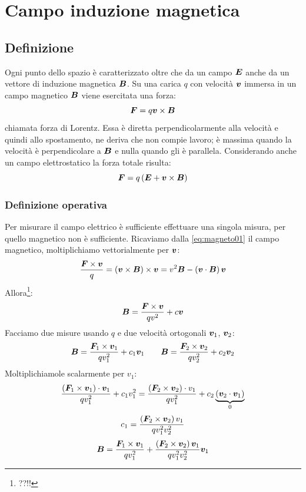 \chapter{Campo induzione magnetica}
\minitoc
\section{Definizione}
Ogni punto dello spazio è caratterizzato oltre che da un campo $\boldsymbol{E}$ anche da un vettore di induzione magnetica $\boldsymbol{B}$. Su una carica $q$ con velocità $\boldsymbol{v}$ immersa in un campo magnetico $\boldsymbol{B}$ viene esercitata una forza:
\begin{equation}
  \boldsymbol{F}=q\boldsymbol{v}\times\boldsymbol{B}
  \label{eq:magneto01}
\end{equation}
chiamata forza di Lorentz. Essa è diretta perpendicolarmente alla velocità e quindi allo spostamento, ne deriva che non compie lavoro; è massima quando la velocità è perpendicolare a $\boldsymbol{B}$ e nulla quando gli è parallela. Considerando anche un campo elettrostatico la forza totale risulta:
\begin{equation}
  \boldsymbol{F}=q\left(\boldsymbol{E}+\boldsymbol{v}\times \boldsymbol{B}\right)
  \label{eq:forza_lorentz2}
\end{equation}
\subsection{Definizione operativa}
Per misurare il campo elettrico è sufficiente effettuare una singola misura, per quello magnetico non è sufficiente. Ricaviamo dalla \eqref{eq:magneto01} il campo magnetico, moltiplichiamo vettorialmente per $\boldsymbol{v}$:
\[\frac{\boldsymbol{F}\times\boldsymbol{v}}{q}=\left(\boldsymbol{v}\times\boldsymbol{B}\right)\times\boldsymbol{v}=v^2\boldsymbol{B}-\left(\boldsymbol{v}\cdot\boldsymbol{B}\right)\boldsymbol{v}\]
Allora\footnote{??!!}:
\[\boldsymbol{B}=\frac{\boldsymbol{F}\times\boldsymbol{v}}{qv^2}+c\boldsymbol{v}\]
Facciamo due misure usando $q$ e due velocità ortogonali $\boldsymbol{v}_1$, $\boldsymbol{v}_2$:
\[\boldsymbol{B}=\frac{\boldsymbol{F}_1\times \boldsymbol{v}_1}{qv_1^2}+c_1\boldsymbol{v}_1\qquad\boldsymbol{B}=\frac{\boldsymbol{F}_2\times\boldsymbol{v}_2}{qv_2^2}+c_2\boldsymbol{v}_2\]
Moltiplichiamole scalarmente per $v_1$:
\[\frac{\left(\boldsymbol{F}_1\times \boldsymbol{v}_1\right)\cdot\boldsymbol{v}_1}{qv_1^2}+c_1v_1^2=\frac{\left(\boldsymbol{F}_2\times\boldsymbol{v}_2\right)\cdot v_1}{qv_1^2}+c_2\underbrace{\left(\boldsymbol{v}_2\cdot \boldsymbol{v}_1\right)}_{0}\]
\[c_1=\frac{\left(\boldsymbol{F}_2\times\boldsymbol{v}_2\right)v_1}{qv_1^2v_2^2}\]
\[\boldsymbol{B}=\frac{\boldsymbol{F}_1\times\boldsymbol{v}_1}{qv_1^2}+\frac{\left(\boldsymbol{F}_2\times\boldsymbol{v}_2\right)\boldsymbol{v}_1}{qv_1^2v_2^2}\boldsymbol{v}_1\]
